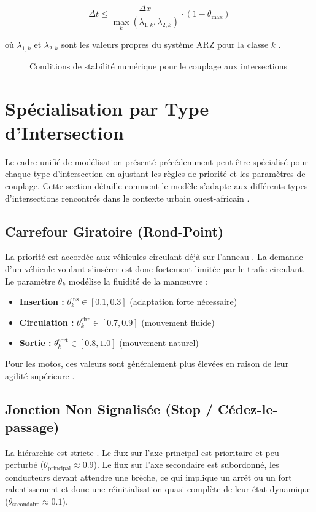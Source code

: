 \[
\Delta t \leq \frac{\Delta x}{\max_k(\lambda_{1,k}, \lambda_{2,k})} \cdot (1 - \theta_{\max})
\]

où $ \lambda_{1,k} $ et $ \lambda_{2,k} $ sont les valeurs propres du système ARZ pour la classe $ k $ \cite{FanHertySeibold2014}.

\begin{figure}[htbp]
\centering
\caption{Conditions de stabilité numérique pour le couplage aux intersections}
\label{fig:stabilite_numerique}
\end{figure}

\section{Spécialisation par Type d'Intersection}
Le cadre unifié de modélisation présenté précédemment peut être spécialisé pour chaque type d'intersection en ajustant les règles de priorité et les paramètres de couplage. Cette section détaille comment le modèle s'adapte aux différents types d'intersections rencontrés dans le contexte urbain ouest-africain \cite{LebacqueKhoshyaran2005}.

\subsection{Carrefour Giratoire (Rond-Point)}
La priorité est accordée aux véhicules circulant déjà sur l'anneau \cite{BargBrockfeld2012}. La demande d'un véhicule voulant s'insérer est donc fortement limitée par le trafic circulant. Le paramètre $ \theta_k $ modélise la fluidité de la manœuvre :
\begin{itemize}
    \item \textbf{Insertion :} $ \theta_k^{\text{ins}} \in [0.1, 0.3] $ (adaptation forte nécessaire)
    \item \textbf{Circulation :} $ \theta_k^{\text{circ}} \in [0.7, 0.9] $ (mouvement fluide)
    \item \textbf{Sortie :} $ \theta_k^{\text{sort}} \in [0.8, 1.0] $ (mouvement naturel)
\end{itemize}
Pour les motos, ces valeurs sont généralement plus élevées en raison de leur agilité supérieure \cite{NguyenEtAl2012}.

\subsection{Jonction Non Signalisée (Stop / Cédez-le-passage)}
La hiérarchie est stricte \cite{BrockfeldKlar2002}. Le flux sur l'axe principal est prioritaire et peu perturbé ($ \theta_{\text{principal}} \approx 0.9 $). Le flux sur l'axe secondaire est subordonné, les conducteurs devant attendre une brèche, ce qui implique un arrêt ou un fort ralentissement et donc une réinitialisation quasi complète de leur état dynamique ($ \theta_{\text{secondaire}} \approx 0.1 $).

